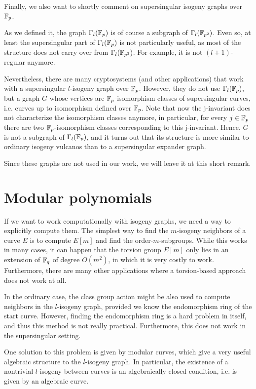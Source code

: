 Finally, we also want to shortly comment on supersingular isogeny graphs over $\mathbb{F}_p$.
\begin{remark}
    As we defined it, the graph $\Gamma_l(\mathbb{F}_p)$ is of course a subgraph of $\Gamma_l(\mathbb{F}_{p^2})$.
    Even so, at least the supersingular part of $\Gamma_l(\mathbb{F}_p)$ is not particularly useful, as most of the structure does not carry over from $\Gamma_l(\mathbb{F}_{p^2})$.
    For example, it is not $(l + 1)$-regular anymore.

    Nevertheless, there are many cryptosystems (and other applications) that work with a supersingular $l$-isogeny graph over $\mathbb{F}_p$.
    However, they do not use $\Gamma_l(\mathbb{F}_p)$, but a graph $G$ whose vertices are $\mathbb{F}_p$-isomorphism classes of supersingular curves, i.e. curves up to isomorphism defined over $\mathbb{F}_p$.
    Note that now the j-invariant does not characterize the isomorphism classes anymore, in particular, for every $j \in \mathbb{F}_p$ there are two $\mathbb{F}_p$-isomorphism classes corresponding to this j-invariant.
    Hence, $G$ is not a subgraph of $\Gamma_l(\mathbb{F}_p)$, and it turns out that its structure is more similar to ordinary isogeny vulcanos than to a supersingular expander graph.
\end{remark}
Since these graphs are not used in our work, we will leave it at this short remark.

\section{Modular polynomials}
If we want to work computationally with isogeny graphs, we need a way to explicitly compute them.
The simplest way to find the $m$-isogeny neighbors of a curve $E$ is to compute $E[m]$ and find the order-$m$-subgroups.
While this works in many cases, it can happen that the torsion group $E[m]$ only lies in an extension of $\mathbb{F}_q$ of degree $O(m^2)$, in which it is very costly to work.
Furthermore, there are many other applications where a torsion-based approach does not work at all.

In the ordinary case, the class group action might be also used to compute neighbors in the $l$-isogeny graph, provided we know the endomorphism ring of the start curve.
However, finding the endomorphism ring is a hard problem in itself, and thus this method is not really practical.
Furthermore, this does not work in the supersingular setting.

One solution to this problem is given by modular curves, which give a very useful algebraic structure to the $l$-isogeny graph.
In particular, the existence of a nontrivial $l$-isogeny between curves is an algebraically closed condition, i.e. is given by an algebraic curve.

